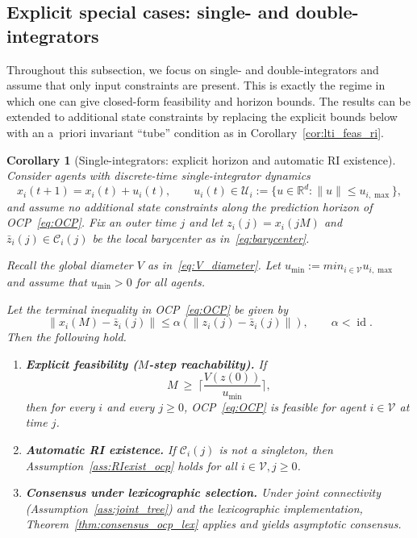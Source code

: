 \documentclass[12pt,draftcls,onecolumn]{IEEEtran}
\newtheorem{corollary}{Corollary}
\def\field#1{\mathbb #1}%
\def\R{\field{R}}%
\newcommand{\U}{\ensuremath{\mathcal U}}
\DeclareMathOperator{\id}{id}
\def\V{\mathcal{V}}
\def\Cij{\mathcal{C}_i (j)}
\begin{document}
\subsection{Explicit special cases: single- and double-integrators}\label{subsec:explicit_integrators}

Throughout this subsection, we focus on single- and double-integrators and assume that only input constraints are present.
This is exactly the regime in which one can give closed-form feasibility and horizon bounds. 
The results can be extended to additional state constraints by replacing the explicit bounds
below with an a~priori invariant ``tube'' condition as in Corollary~\ref{cor:lti_feas_ri}.

\medskip

\begin{corollary}[Single-integrators: explicit horizon and automatic RI existence]\label{cor:single_integrator_explicit}
Consider agents with discrete-time single-integrator dynamics
\begin{equation}\label{eq:si}
x_i(t{+}1)=x_i(t)+u_i(t),\qquad u_i(t)\in \U_i:=\{u\in\R^d:\|u\|\le u_{i,\max}\},
\end{equation}
and assume no additional state constraints along the prediction horizon of OCP~\eqref{eq:OCP}.
Fix an outer time $j$ and let $z_i(j)=x_i(jM)$ and $\bar z_i(j)\in \Cij$ be the local barycenter as in~\eqref{eq:barycenter}.

Recall the global diameter $V$ as in~\eqref{eq:V_diameter}.
Let $u_{\min} := min_{i\in\V} u_{i,\max}$ and assume that $u_{\min}>0$ for all agents.

Let the terminal inequality in OCP~\eqref{eq:OCP} be given by
\[
\|x_i(M)-\bar z_i(j)\|\le \alpha(\|z_i(j)-\bar z_i(j)\|),\qquad \alpha<\id.
\]
Then the following hold.

\begin{enumerate}
\item[(a)] \textbf{Explicit feasibility ($M$-step reachability).}
If
\begin{equation}\label{eq:M_SI}
M \ \ge\ \Big\lceil \frac{V(z(0))}{u_{\min}}\Big\rceil,
\end{equation}
then for every $i$ and every $j\ge 0$, OCP~\eqref{eq:OCP} is feasible for agent $i\in\V$ at time $j$.

\item[(b)] \textbf{Automatic RI existence.}
If $\Cij$ is not a singleton, then Assumption~\ref{ass:RIexist_ocp} holds for all $i\in\V,j\geq 0$.

\item[(c)] \textbf{Consensus under lexicographic selection.}
Under joint connectivity (Assumption~\ref{ass:joint_tree}) and the lexicographic implementation, Theorem~\ref{thm:consensus_ocp_lex} applies and yields asymptotic consensus.
\end{enumerate}

\end{corollary}
\end{document}
